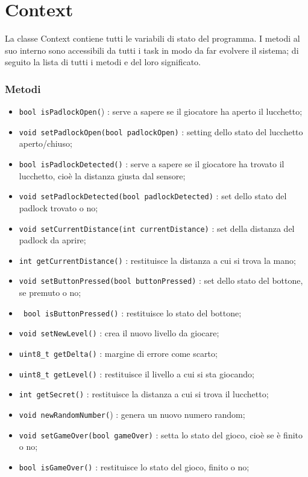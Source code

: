 \section{Context}\label{sec:context}
La classe Context contiene tutti le variabili di stato del programma. I metodi al suo interno sono accessibili da tutti i task in modo da far evolvere il sistema; di seguito la lista di tutti i metodi e del loro significato.

\subsubsection{Metodi}
\begin{itemize}
	\item \texttt{bool isPadlockOpen(}) : serve a sapere se il giocatore ha aperto il lucchetto;
	\item \texttt{void setPadlockOpen(bool padlockOpen)} : setting dello stato del lucchetto aperto/chiuso;
	\item \texttt{bool isPadlockDetected()} : serve a sapere se il giocatore ha trovato il lucchetto, cioè la distanza giusta dal sensore;
	\item \texttt{void setPadlockDetected(bool padlockDetected)} : set dello stato del padlock trovato o no;
	\item \texttt{void setCurrentDistance(int currentDistance)} : set della distanza del padlock da aprire;
	\item \texttt{int getCurrentDistance()} : restituisce la distanza a cui si trova la mano;
	\item \texttt{void setButtonPressed(bool buttonPressed)} : set dello stato del bottone, se premuto o no;
	\item \texttt{ bool isButtonPressed()} : restituisce lo stato del bottone;
	\item \texttt{void setNewLevel()} : crea il nuovo livello da giocare;
	\item \texttt{uint8\_t getDelta()} : margine di errore come scarto;
	\item \texttt{uint8\_t getLevel()} : restituisce il livello a cui si sta giocando;
	\item \texttt{int getSecret()} : restituisce la distanza a cui si trova il lucchetto;
	\item \texttt{void newRandomNumber(}) : genera un nuovo numero random;
	\item \texttt{void setGameOver(bool gameOver)} : setta lo stato del gioco, cioè se è finito o no;
	\item \texttt{bool isGameOver()} : restituisce lo stato del gioco, finito o no;

\end{itemize}
